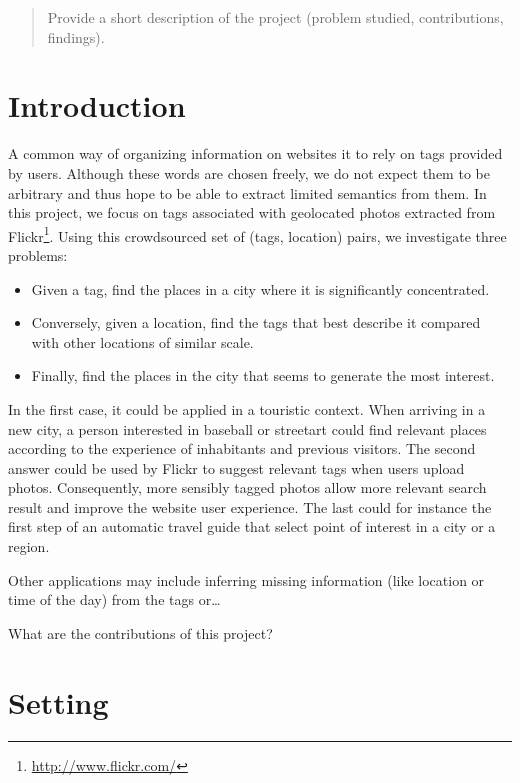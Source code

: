 \begin{abstract}
Provide a short description of the project (problem studied, contributions, findings).
\end{abstract}

\section{Introduction}

A common way of organizing information on websites it to rely on tags provided
by users. Although these words are chosen freely, we do not expect them to be
arbitrary and thus hope to be able to extract limited semantics from them. In
this project, we focus on tags associated with geolocated photos extracted
from
Flickr\footnote{\href{https://secure.flickr.com/}{http://www.flickr.com/}}.
Using this crowdsourced set of (tags, location) pairs, we investigate three
problems:
\begin{itemize}
	\item Given a tag, find the places in a city where it is significantly
		concentrated.
	\item Conversely, given a location, find the tags that best describe it
		compared with other locations of similar scale.
	\item Finally, find the places in the city that seems to generate the
		most interest.
\end{itemize}

In the first case, it could be applied in a touristic context. When arriving in a
new city, a person interested in \textsf{baseball} or \textsf{streetart} could
find relevant places according to the experience of inhabitants and previous
visitors. The second answer could be used by Flickr to suggest relevant tags
when users upload photos. Consequently, more sensibly tagged photos allow more
relevant search result and improve the website user experience. The last could
for instance the first step of an automatic travel guide that select point of
interest in a city or a region.

Other applications may include inferring missing information (like location or
time of the day) from the tags or…

What are the contributions of this project?

\section{Setting}
\label{sec:setting}

